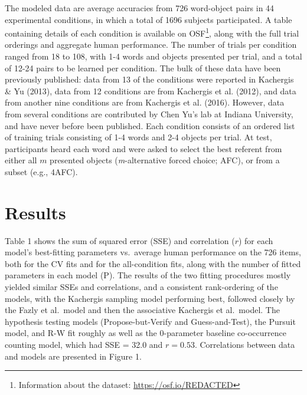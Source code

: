 \documentclass[10pt, letterpaper]{article}
\begin{document}
The modeled data are average accuracies from 726 word-object pairs in 44
experimental conditions, in which a total of 1696 subjects participated.
A table containing details of each condition is available on
OSF\footnote{Information about the dataset:
  \href{https://osf.io/s2aty/?view_only=c91c852f00b847e0a71d5f4deaf7b7a5}{https://osf.io/REDACTED}},
along with the full trial orderings and aggregate human performance. The
number of trials per condition ranged from 18 to 108, with 1-4 words and
objects presented per trial, and a total of 12-24 pairs to be learned
per condition. The bulk of these data have been previously published:
data from 13 of the conditions were reported in Kachergis \& Yu (2013),
data from 12 conditions are from Kachergis et al. (2012), and data from
another nine conditions are from Kachergis et al. (2016). However, data
from several conditions are contributed by Chen Yu's lab at Indiana
University, and have never before been published. Each condition
consists of an ordered list of training trials consisting of 1-4 words
and 2-4 objects per trial. At test, participants heard each word and
were asked to select the best referent from either all \(m\) presented
objects (\emph{m}-alternative forced choice; AFC), or from a subset
(e.g., 4AFC).

\hypertarget{results}{%
\section{Results}\label{results}}

Table 1 shows the sum of squared error (SSE) and correlation (\(r\)) for
each model's best-fitting parameters vs.~average human performance on
the 726 items, both for the CV fits and for the all-condition fits,
along with the number of fitted parameters in each model (P). The
results of the two fitting procedures mostly yielded similar SSEs and
correlations, and a consistent rank-ordering of the models, with the
Kachergis sampling model performing best, followed closely by the Fazly
et al.~model and then the associative Kachergis et al.~model. The
hypothesis testing models (Propose-but-Verify and Guess-and-Test), the
Pursuit model, and R-W fit roughly as well as the 0-parameter baseline
co-occurrence counting model, which had SSE = 32.0 and \(r = 0.53\).
Correlations between data and models are presented in Figure 1.
\end{document}
